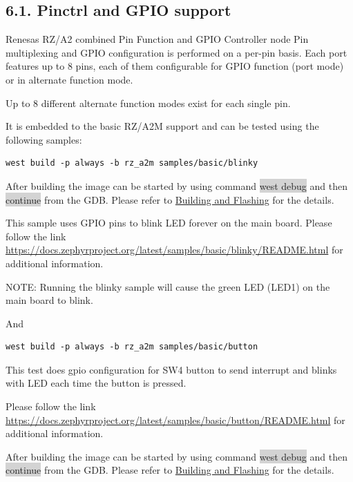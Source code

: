 \documentclass[11pt,a4paper,oneside]{article}
\begin{document}
\subsection*{\texorpdfstring{6.1. Pinctrl and GPIO
support}{6.1. Pinctrl and GPIO support}}\label{pinctrl-and-gpio-support}

Renesas RZ/A2 combined Pin Function and GPIO Controller node Pin
multiplexing and GPIO configuration is performed on a per-pin basis.
Each port features up to 8 pins, each of them configurable for GPIO
function (port mode) or in alternate function mode.

Up to 8 different alternate function modes exist for each single pin.

It is embedded to the basic RZ/A2M support and can be tested using the
following samples:

\begin{lstlisting}
west build -p always -b rz_a2m samples/basic/blinky
\end{lstlisting}

After building the image can be started by using command \colorbox{lightgray}{west debug}
and then \colorbox{lightgray}{continue} from the GDB. Please refer to
\hyperref[building-and-flashing]{Building and Flashing} for the
details.

This sample uses GPIO pins to blink LED forever on the main board.
Please follow the link
\url{https://docs.zephyrproject.org/latest/samples/basic/blinky/README.html}
for additional information.

NOTE: Running the \textquotesingle blinky\textquotesingle{} sample will
cause the green LED (LED1) on the main board to blink.

And

\begin{lstlisting}
west build -p always -b rz_a2m samples/basic/button
\end{lstlisting}

This test does gpio configuration for SW4 button to send interrupt and
blinks with LED each time the button is pressed.

Please follow the link
\url{https://docs.zephyrproject.org/latest/samples/basic/button/README.html}
for additional information.

After building the image can be started by using command \colorbox{lightgray}{west debug}
and then \colorbox{lightgray}{continue} from the GDB. Please refer to
\hyperref[building-and-flashing]{Building and Flashing} for the
details.
\end{document}
